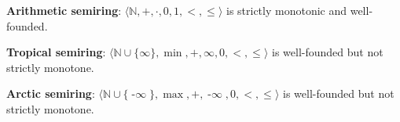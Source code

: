 \begin{example}
    \label{ex:semiring_examples}
    \textbf{Arithmetic semiring}: \(\langle \mathbb{N}, +, \cdot, 0, 1, <, \leq \rangle\) is strictly monotonic and well-founded.

    \textbf{Tropical semiring}: \(\langle \mathbb{N} \mathop{\cup} \{\infty\}, \mathop{\min}, +, \infty, 0, <, \leq \rangle\) is well-founded but not strictly monotone.

    \textbf{Arctic semiring}: \(\langle \mathbb{N} \mathop{\cup} \{\mathop{-\infty}\}, \max, +, \mathop{-\infty}, 0, <, \leq \rangle\) is well-founded but not strictly monotone.
\end{example}